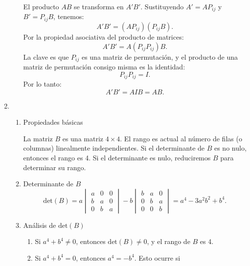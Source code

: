 \begin{enumerate}[label=\color{red}\textbf{\arabic*)}]
\begin{enumerate}[label=Paso \arabic*:]
                El producto $AB$ se transforma en $A'B'$. Sustituyendo  $A'=AP_{ij}$ y $B'=P_{ij}B$, tenemos: \[
                A'B'=(AP_{ij})(P_{ij}B).
                \] 
                Por la propiedad asociativa del producto de matrices: \[
                    A'B'=A(P_{ij}P_{ij})B.
                \] 
                La clave es que $P_{ij}$ es una matriz de permutación, y el producto de una matriz de permutación consigo misma es la identidad: \[
                P_{ij}P_{ij}=I.
                \] 
                Por lo tanto: \[
                A'B'=AIB=AB.
                \] 
        \end{enumerate}
    \item {}
    \begin{enumerate}[label=Paso \arabic*:]
        \item Propiedades básicas

            La matriz $B$ es una matriz $4\times 4$. El rango es actual al número de filas (o columnas) linealmente independientes. Si el determinante de $B$ es no nulo, entonces el rango es 4. Si el determinante es nulo, reduciremos  $B$ para determinar su rango.
        \item Determinante de $B$
\[
\mathrm{det}(B)=a\begin{vmatrix}
a & 0 & 0\\
b & a & 0\\
0 & b & a
\end{vmatrix}-b\begin{vmatrix}
b & a & 0\\
0 & b & a\\
0 & 0 & b
\end{vmatrix}=a^4-3a^2b^2+b^4.
\] 

\item Análisis de $\mathrm{det}(B)$ 
    \begin{enumerate}[label=\arabic*)]
        \item Si $a^4+b^4\neq 0$, entonces $\mathrm{det}(B)\neq 0$, y el rango de $B$ es 4.
        \item Si  $a^4+b^4=0$, entonces $a^4=-b^4$. Esto ocurre si
    \end{enumerate}
    \end{enumerate}


\end{enumerate}
